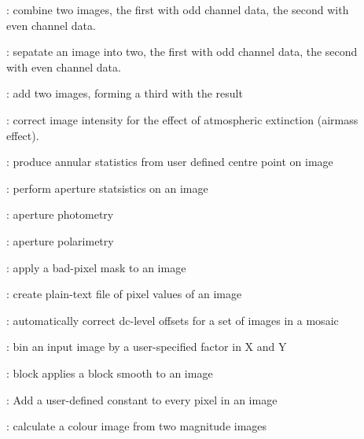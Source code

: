 \begin{description}
\begin{description}

\item []: combine two images, the first with odd
channel data, the second with even channel data.

\item []: sepatate an image into two, the first
with odd channel data, the second with even channel data.

\item []: add two images, forming a third with the result

\item []: correct image intensity for the
effect of atmospheric extinction (airmass effect).

\item []: produce annular statistics from
user defined centre point on image

\item []: perform aperture statsistics on an image

\item []: aperture photometry

\item []: aperture polarimetry

\item []: apply a bad-pixel mask to an image

\item []: create plain-text file of pixel
values of an image

\item []: automatically correct dc-level
offsets for a set of images in a mosaic

\item []: bin an input image by a user-specified
factor in X and Y

\item []: block applies a block smooth to an image

\item []: Add a user-defined constant to every
pixel in an image

\item []: calculate a colour image from two
magnitude images


\end{description}
\end{description}
